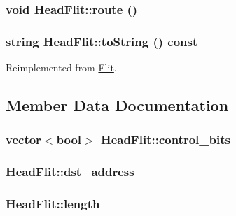 \hypertarget{classHeadFlit_45b1f981d63ba53d1814250cc7efa9a4}{
\subsubsection[{route}]{\setlength{\rightskip}{0pt plus 5cm}void HeadFlit::route ()}}
\label{classHeadFlit_45b1f981d63ba53d1814250cc7efa9a4}


\hypertarget{classHeadFlit_4d22ac839cad2ac7ef0aedfeb54c9421}{
\subsubsection[{toString}]{\setlength{\rightskip}{0pt plus 5cm}string HeadFlit::toString () const}}
\label{classHeadFlit_4d22ac839cad2ac7ef0aedfeb54c9421}




Reimplemented from \hyperlink{classFlit_ffc6c729a005389b51818aac59710dab}{Flit}.

\subsection{Member Data Documentation}
\hypertarget{classHeadFlit_96e3a75d0e2d04fb465e4b7463e7325e}{
\subsubsection[{control\_\-bits}]{\setlength{\rightskip}{0pt plus 5cm}vector$<$bool$>$ {\bf HeadFlit::control\_\-bits}}}
\label{classHeadFlit_96e3a75d0e2d04fb465e4b7463e7325e}


\hypertarget{classHeadFlit_1c5bf74e402bfa95645fb9cb4d188798}{
\subsubsection[{dst\_\-address}]{ {\bf HeadFlit::dst\_\-address}}}
\label{classHeadFlit_1c5bf74e402bfa95645fb9cb4d188798}


\hypertarget{classHeadFlit_b506d4907576fce81b277b30995e9867}{
\subsubsection[{length}]{ {\bf HeadFlit::length}}}
\label{classHeadFlit_b506d4907576fce81b277b30995e9867}


